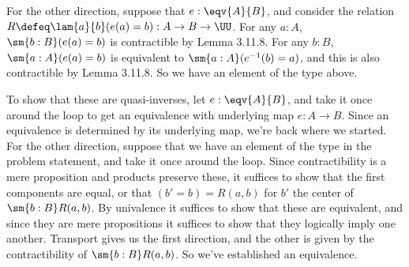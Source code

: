 For the other direction, suppose that $e : \eqv{A}{B}$, and consider the
relation $R \defeq \lam{a}{b}(e(a) = b) : A \to B \to \UU$.  For any $a : A$,
$\sm{b:B}(e(a) = b)$ is contractible by Lemma 3.11.8.  For any $b:B$,
$\sm{a:A}(e(a) = b)$ is equivalent to $\sm{a:A}(e^{-1}(b) = a)$, and this is
also contractible by Lemma 3.11.8.  So we have an element of the type above.


To show that these are quasi-inverses, let $e : \eqv{A}{B}$, and take it once
around the loop to get an equivalence with underlying map $e : A \to B$.  Since
an equivalence is determined by its underlying map, we're back where we
started.  For the other direction, suppose that we have an element of the type
in the problem statement, and take it once around the loop.  Since
contractibility is a mere proposition and products preserve these, it suffices
to show that the first components are equal, or that $(b' = b) = R(a, b)$ for
$b'$ the center of $\sm{b:B}R(a, b)$.  By univalence it suffices to show that
these are equivalent, and since they are mere propositions it suffices to show
that they logically imply one another.  Transport gives us the first
direction, and the other is given by the contractibility of $\sm{b:B}R(a, b)$.
So we've established an equivalence.


